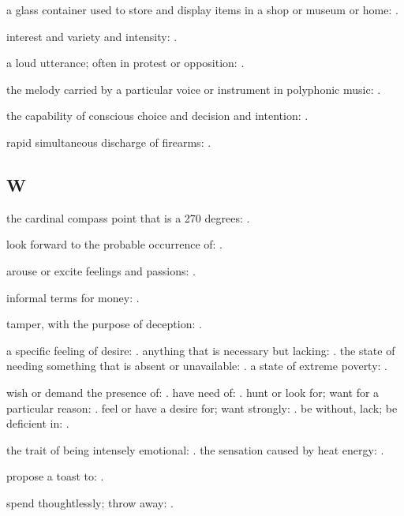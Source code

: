   a glass container used to store and display items in a shop or museum or home: .

  interest and variety and intensity: .

  a loud utterance; often in protest or opposition: .

  the melody carried by a particular voice or instrument in polyphonic music: .

  the capability of conscious choice and decision and intention: .

  rapid simultaneous discharge of firearms: .

\subsection*{W}

  the cardinal compass point that is a 270 degrees: .

  look forward to the probable occurrence of: .

  arouse or excite feelings and passions: .

  informal terms for money: .

  tamper, with the purpose of deception: .

  a specific feeling of desire: . anything that is necessary but lacking: . the state of needing something that is absent or unavailable: . a state of extreme poverty: .

  wish or demand the presence of: . have need of: . hunt or look for; want for a particular reason: . feel or have a desire for; want strongly: . be without, lack; be deficient in: .

  the trait of being intensely emotional: . the sensation caused by heat energy: .

  propose a toast to: .

  spend thoughtlessly; throw away: .

